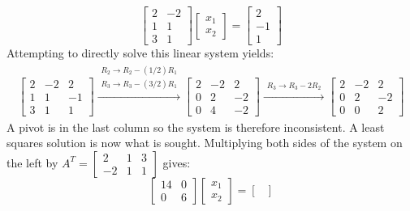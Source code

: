 \documentclass{article}
\begin{document}
\begin{itemize}
\[\begin{bmatrix}
2 & -2 \\ 
1 & 1 \\ 
3 & 1
\end{bmatrix}\begin{bmatrix}
x_1 \\ x_2 
\end{bmatrix} = \begin{bmatrix}
2 \\ -1 \\ 1 
\end{bmatrix}\]
Attempting to directly solve this linear system yields:
\begin{align*}
\left[\begin{array}{cc|c}
2 & -2 &  2 \\ 
1 &  1 & -1 \\ 
3 &  1 &  1
\end{array}\right] 
\xrightarrow{\begin{array}{c} R_2 \rightarrow R_2 - (1/2)R_1 \\ R_3 \rightarrow R_3 - (3/2)R_1 \end{array}} 
\left[\begin{array}{cc|c}
2 & -2 &  2 \\ 
0 &  2 & -2 \\ 
0 &  4 & -2 
\end{array}\right] 
\xrightarrow{\begin{array}{c} R_3 \rightarrow R_3 - 2R_2 \end{array}} 
\left[\begin{array}{cc|c}
2 & -2 &  2 \\ 
0 &  2 & -2 \\ 
0 &  0 &  2   
\end{array}\right] 
\end{align*}
A pivot is in the last column so the system is therefore inconsistent. A least squares solution is now what is sought. Multiplying both sides of the system on the left by \(A^T = \begin{bmatrix} 2 & 1 & 3 \\ -2 & 1 & 1 \end{bmatrix}\) gives:
\[\begin{bmatrix}
14 & 0 \\ 
  0 & 6 
\end{bmatrix}\begin{bmatrix} 
x_1 \\ x_2 
\end{bmatrix} = \begin{bmatrix}

\end{bmatrix}\]
\end{itemize}
\end{document}
